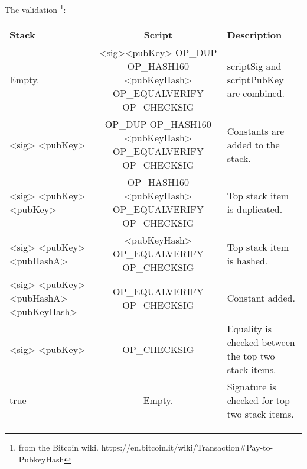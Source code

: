 		The validation \footnote{from the Bitcoin wiki. https://en.bitcoin.it/wiki/Transaction\#Pay-to-PubkeyHash}:
		\begin{center}
			\begin{tabulary}{\textwidth}{|L|C|L|}
			\hline
			\textbf{Stack} & \textbf{Script} & \textbf{Description} \\ \hline
			Empty. & <sig><pubKey> OP\_DUP OP\_HASH160 <pubKeyHash> OP\_EQUALVERIFY OP\_CHECKSIG & scriptSig and scriptPubKey are combined. \\ \hline
			<sig> <pubKey> & OP\_DUP OP\_HASH160 <pubKeyHash> OP\_EQUALVERIFY OP\_CHECKSIG & Constants are added to the stack. \\ \hline
			<sig> <pubKey> <pubKey> & OP\_HASH160 <pubKeyHash> OP\_EQUALVERIFY OP\_CHECKSIG & Top stack item is duplicated. \\ \hline
			<sig> <pubKey> <pubHashA> & <pubKeyHash> OP\_EQUALVERIFY OP\_CHECKSIG & Top stack item is hashed. \\ \hline
			<sig> <pubKey> <pubHashA> <pubKeyHash> & OP\_EQUALVERIFY OP\_CHECKSIG & Constant added. \\ \hline
			<sig> <pubKey> & OP\_CHECKSIG & Equality is checked between the top two stack items. \\ \hline
			true & Empty. & Signature is checked for top two stack items. \\
			\hline
			\end{tabulary}
		\end{center}
		
	
